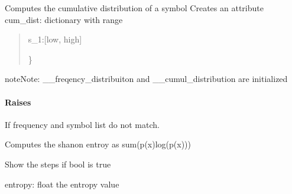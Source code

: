 \documentclass[letterpaper,10pt,english]{sphinxmanual}
\begin{document}
\begin{fulllineitems}
\begin{description}
\sphinxAtStartPar
Computes the cumulative distribution of a symbol
Creates an attribute cum\_dist: dictionary with range
\begin{quote}
\begin{description}
\sphinxlineitem{\{}
\sphinxAtStartPar
s\_1:{[}low, high{]}

\end{description}

\sphinxAtStartPar
\}
\end{quote}

\end{description}

\begin{sphinxadmonition}{note}{Note:}
\sphinxAtStartPar
\_\_freqency\_distribuiton and \_\_cumul\_distribution are initialized
\end{sphinxadmonition}


\paragraph{Raises}
\label{\detokenize{core:raises}}\begin{description}
\sphinxAtStartPar
If frequency and symbol list do not match.

\end{description}

\begin{fulllineitems}
\label{\detokenize{core:core.data.Data.shannon_entropy}}
\pysigstartsignatures
{}
\pysigstopsignatures
\sphinxAtStartPar
Computes the shanon entroy as sum(p(x)log(p(x)))
\begin{description}
\begin{description}
\sphinxAtStartPar
Show the steps if bool is true

\end{description}

\sphinxAtStartPar
entropy: float
the entropy value

\end{description}


\end{fulllineitems}
\end{fulllineitems}
\end{document}
